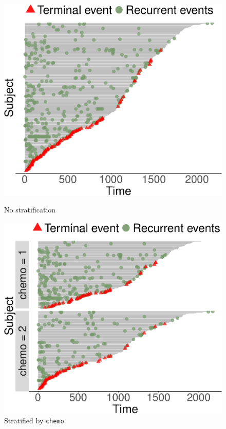 \vspace*{-.3cm}\begin{figure}[H]
    \centering
    \begin{minipage}{0.245\textwidth}
        \centering
        \includegraphics[scale = .25]{images/ep-1}
        \caption{No stratification}
    \end{minipage}\hfill
    \begin{minipage}{0.245\textwidth}
        \centering
        \includegraphics[scale = .25]{images/ep-2}
        \caption{Stratified by \texttt{chemo}.}
    \end{minipage}
\end{figure}
